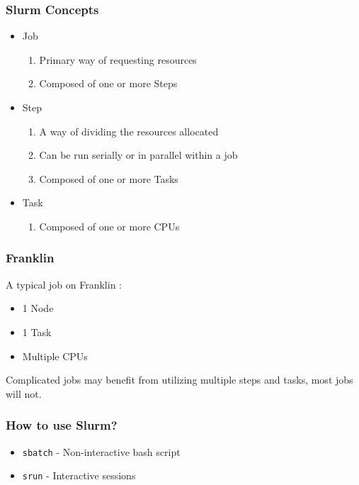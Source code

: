 \documentclass{beamer}
\newcommand{\code}[1]{\colorbox{codegray}{\texttt{#1}}}
\begin{document}
\begin{frame}
\frametitle{Slurm Concepts}
\begin{itemize}
    \item Job
    \pause 
    \begin{enumerate}
        \item Primary way of requesting resources
        \pause
        \item Composed of one or more Steps
    \end{enumerate}
    \bigskip
    \pause
    \item Step
    \begin{enumerate}
        \item A way of dividing the resources allocated
        \pause
        \item Can be run serially or in parallel within a job
        \pause
        \item Composed of one or more Tasks
    \end{enumerate}
    \bigskip
    \pause
    \item Task
    \begin{enumerate}
        \item Composed of one or more CPUs
    \end{enumerate}
    \bigskip
\end{itemize}
\end{frame}



\begin{frame}
\frametitle{Franklin}
A typical job on Franklin : 
\bigskip
\begin{itemize}
    \item 1 Node 
    \bigskip
    \pause
    \item 1 Task
    \bigskip
    \pause
    \item Multiple CPUs
    \bigskip
    \pause
\end{itemize}
Complicated jobs may benefit from utilizing multiple steps and tasks, most jobs will not.
\end{frame}


\begin{frame}
\frametitle{How to use Slurm?}
\begin{itemize}
    \item \code{sbatch} - Non-interactive bash script
    \bigskip
    \pause
    \item \code{srun} - Interactive sessions 
    \bigskip
\end{itemize}
\end{frame}
\end{document}
